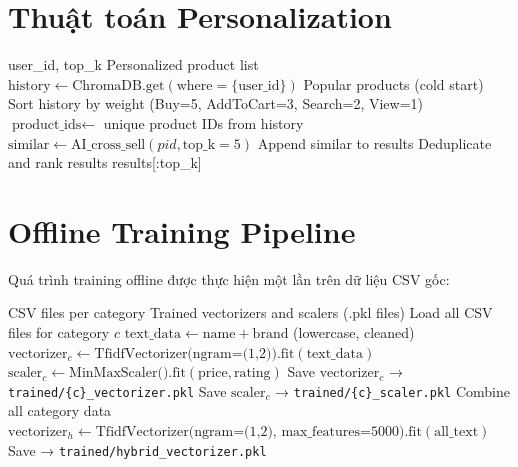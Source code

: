 \documentclass[12pt,a4paper]{report}
\begin{document}
\section{Thuật toán Personalization}

\begin{algorithm}[H]
\caption{Personalized Recommendation via ChromaDB}
\begin{algorithmic}[1]
\REQUIRE user\_id, top\_k
\ENSURE Personalized product list
\STATE $\text{history} \leftarrow \text{ChromaDB.get}(\text{where}=\{\text{user\_id}\})$
    \RETURN Popular products (cold start)
\ENDIF
\STATE Sort history by weight (Buy=5, AddToCart=3, Search=2, View=1)
\STATE $\text{product\_ids} \leftarrow$ unique product IDs from history
    \STATE $\text{similar} \leftarrow \text{AI\_cross\_sell}(pid, \text{top\_k}=5)$
    \STATE Append similar to results
\ENDFOR
\STATE Deduplicate and rank results
\RETURN results[:top\_k]
\end{algorithmic}
\end{algorithm}

\section{Offline Training Pipeline}

Quá trình training offline được thực hiện một lần trên dữ liệu CSV gốc:

\begin{algorithm}[H]
\caption{Offline Training}
\begin{algorithmic}[1]
\REQUIRE CSV files per category
\ENSURE Trained vectorizers and scalers (.pkl files)
    \STATE Load all CSV files for category $c$
    \STATE $\text{text\_data} \leftarrow \text{name} + \text{brand}$ (lowercase, cleaned)
    \STATE $\text{vectorizer}_c \leftarrow \text{TfidfVectorizer(ngram=(1,2)).fit}(\text{text\_data})$
    \STATE $\text{scaler}_c \leftarrow \text{MinMaxScaler().fit}(\text{price}, \text{rating})$
    \STATE Save $\text{vectorizer}_c$ → \texttt{trained/\{c\}\_vectorizer.pkl}
    \STATE Save $\text{scaler}_c$ → \texttt{trained/\{c\}\_scaler.pkl}
\ENDFOR
\STATE {}
\STATE Combine all category data
\STATE $\text{vectorizer}_h \leftarrow \text{TfidfVectorizer(ngram=(1,2), max\_features=5000).fit}(\text{all\_text})$
\STATE Save → \texttt{trained/hybrid\_vectorizer.pkl}
\end{algorithmic}
\end{algorithm}
\end{document}
